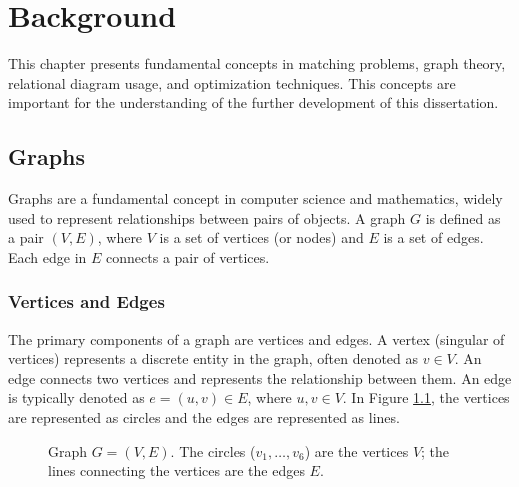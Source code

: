 
\chapter{Background} \label{chap:background}

    This chapter presents fundamental concepts in matching problems, graph theory, relational diagram usage, and optimization techniques. This concepts are important for the understanding of the further development of this dissertation.
    \section{Graphs}
    
        Graphs are a fundamental concept in computer science and mathematics, widely used to represent relationships between pairs of objects. A graph \( G \) is defined as a pair \( (V, E) \), where \( V \) is a set of vertices (or nodes) and \( E \) is a set of edges. Each edge in \( E \) connects a pair of vertices.

        \subsection{Vertices and Edges}
        
            The primary components of a graph are vertices and edges. A vertex (singular of vertices) represents a discrete entity in the graph, often denoted as \( v \in V \). An edge connects two vertices and represents the relationship between them. An edge is typically denoted as \( e = (u, v) \in E \), where \( u, v \in V \).
            In Figure \ref{fig:base_graph}, the vertices are represented as circles and the edges are represented as lines.

            
            \begin{figure}[!ht]
                \centering
                \caption{Graph $G = (V, E)$. The circles ($v_1, \ldots, v_6$) are the vertices $V$; the lines connecting the vertices are the edges $E$.} \label{fig:base_graph}
            \end{figure}
        
